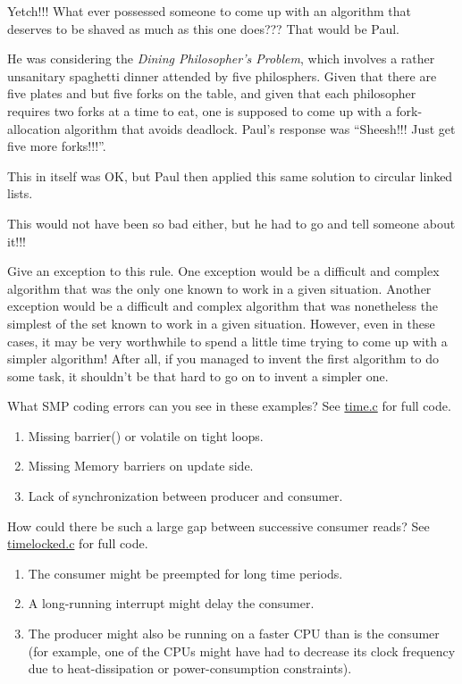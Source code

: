 \QuickQ{}
	Yetch!!!
	What ever possessed someone to come up with an algorithm
	that deserves to be shaved as much as this one does???
\QuickA{}
	That would be Paul.

	He was considering the \emph{Dining Philosopher's Problem}, which
	involves a rather unsanitary spaghetti dinner attended by
	five philosphers.
	Given that there are five plates and but five forks on the table, and
	given that each philosopher requires two forks at a time to eat,
	one is supposed to come up with a fork-allocation algorithm that
	avoids deadlock.
	Paul's response was ``Sheesh!!!  Just get five more forks!!!''.

	This in itself was OK, but Paul then applied this same solution to
	circular linked lists.

	This would not have been so bad either, but he had to go and tell
	someone about it!!!

\QuickQ{}
	Give an exception to this rule.
\QuickA{}
	One exception would be a difficult and complex algorithm that
	was the only one known to work in a given situation.
	Another exception would be a difficult and complex algorithm
	that was nonetheless the simplest of the set known to work in
	a given situation.
	However, even in these cases, it may be very worthwhile to spend
	a little time trying to come up with a simpler algorithm!
	After all, if you managed to invent the first algorithm
	to do some task, it shouldn't be that hard to go on to
	invent a simpler one.

\QuickQ{}
	What SMP coding errors can you see in these examples?
	See \url{time.c} for full code.
\QuickA{}
	\begin{enumerate}
	\item	Missing barrier() or volatile on tight loops.
	\item	Missing Memory barriers on update side.
	\item	Lack of synchronization between producer and consumer.
	\end{enumerate}

\QuickQ{}
	How could there be such a large gap between successive
	consumer reads?
	See \url{timelocked.c} for full code.
\QuickA{}
	\begin{enumerate}
	\item	The consumer might be preempted for long time periods.
	\item	A long-running interrupt might delay the consumer.
	\item	The producer might also be running on a faster CPU than is the
		consumer (for example, one of the CPUs might have had to
		decrease its
		clock frequency due to heat-dissipation or power-consumption
		constraints).
	\end{enumerate}

